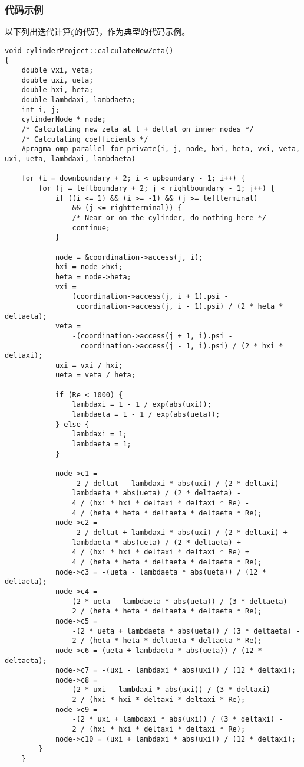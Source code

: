 \documentclass[12pt]{article}
\begin{document}
\subsubsection{代码示例}
以下列出迭代计算$\zeta$的代码，作为典型的代码示例。
\begin{lstlisting}
void cylinderProject::calculateNewZeta()
{
    double vxi, veta;
    double uxi, ueta;
    double hxi, heta;
    double lambdaxi, lambdaeta;
    int i, j;
    cylinderNode * node;
    /* Calculating new zeta at t + deltat on inner nodes */
    /* Calculating coefficients */
    #pragma omp parallel for private(i, j, node, hxi, heta, vxi, veta, uxi, ueta, lambdaxi, lambdaeta)

    for (i = downboundary + 2; i < upboundary - 1; i++) {
        for (j = leftboundary + 2; j < rightboundary - 1; j++) {
            if ((i <= 1) && (i >= -1) && (j >= leftterminal)
                && (j <= rightterminal)) {
                /* Near or on the cylinder, do nothing here */
                continue;
            }

            node = &coordination->access(j, i);
            hxi = node->hxi;
            heta = node->heta;
            vxi =
                (coordination->access(j, i + 1).psi -
                 coordination->access(j, i - 1).psi) / (2 * heta * deltaeta);
            veta =
                -(coordination->access(j + 1, i).psi -
                  coordination->access(j - 1, i).psi) / (2 * hxi * deltaxi);
            uxi = vxi / hxi;
            ueta = veta / heta;

            if (Re < 1000) {
                lambdaxi = 1 - 1 / exp(abs(uxi));
                lambdaeta = 1 - 1 / exp(abs(ueta));
            } else {
                lambdaxi = 1;
                lambdaeta = 1;
            }

            node->c1 =
                -2 / deltat - lambdaxi * abs(uxi) / (2 * deltaxi) -
                lambdaeta * abs(ueta) / (2 * deltaeta) -
                4 / (hxi * hxi * deltaxi * deltaxi * Re) -
                4 / (heta * heta * deltaeta * deltaeta * Re);
            node->c2 =
                -2 / deltat + lambdaxi * abs(uxi) / (2 * deltaxi) +
                lambdaeta * abs(ueta) / (2 * deltaeta) +
                4 / (hxi * hxi * deltaxi * deltaxi * Re) +
                4 / (heta * heta * deltaeta * deltaeta * Re);
            node->c3 = -(ueta - lambdaeta * abs(ueta)) / (12 * deltaeta);
            node->c4 =
                (2 * ueta - lambdaeta * abs(ueta)) / (3 * deltaeta) -
                2 / (heta * heta * deltaeta * deltaeta * Re);
            node->c5 =
                -(2 * ueta + lambdaeta * abs(ueta)) / (3 * deltaeta) -
                2 / (heta * heta * deltaeta * deltaeta * Re);
            node->c6 = (ueta + lambdaeta * abs(ueta)) / (12 * deltaeta);
            node->c7 = -(uxi - lambdaxi * abs(uxi)) / (12 * deltaxi);
            node->c8 =
                (2 * uxi - lambdaxi * abs(uxi)) / (3 * deltaxi) -
                2 / (hxi * hxi * deltaxi * deltaxi * Re);
            node->c9 =
                -(2 * uxi + lambdaxi * abs(uxi)) / (3 * deltaxi) -
                2 / (hxi * hxi * deltaxi * deltaxi * Re);
            node->c10 = (uxi + lambdaxi * abs(uxi)) / (12 * deltaxi);
        }
    }


\end{lstlisting}
\end{document}

